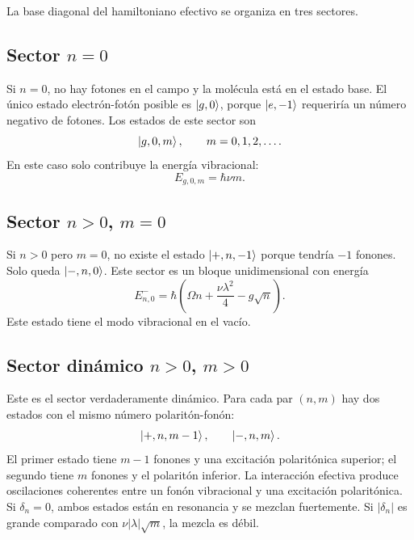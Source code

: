 \documentclass[11pt]{article}
\begin{document}
La base diagonal del hamiltoniano efectivo se organiza en tres sectores.

\subsection{Sector \texorpdfstring{$n=0$}{n=0}}

Si $n=0$, no hay fotones en el campo y la mol\'ecula est\'a en el estado base.
El \'unico estado electr\'on-fot\'on posible es $\ket{g,0}$, porque
$\ket{e,-1}$ requerir\'ia un n\'umero negativo de fotones. Los estados de este
sector son
\begin{equation}
  \ket{g,0,m},
  \qquad
  m=0,1,2,\ldots.
\end{equation}
En este caso solo contribuye la energ\'ia vibracional:
\begin{equation}
  \boxed{
  E_{g,0,m}=\hbar\nu m.
  }
\end{equation}

\subsection{Sector \texorpdfstring{$n>0$, $m=0$}{n mayor que cero, m=0}}

Si $n>0$ pero $m=0$, no existe el estado $\ket{+,n,-1}$ porque tendr\'ia
$-1$ fonones. Solo queda $\ket{-,n,0}$. Este sector es un bloque
unidimensional con energ\'ia
\begin{equation}
  \boxed{
  E_{n,0}^{-}
  =
  \hbar\left(\Omega n+\frac{\nu\lambda^2}{4}-g\sqrt n\right).
  }
\end{equation}
Este estado tiene el modo vibracional en el vac\'io.

\subsection{Sector din\'amico \texorpdfstring{$n>0$, $m>0$}{n mayor que cero, m mayor que cero}}

Este es el sector verdaderamente din\'amico. Para cada par $(n,m)$ hay dos
estados con el mismo n\'umero polarit\'on-fon\'on:
\begin{equation}
  \ket{+,n,m-1},
  \qquad
  \ket{-,n,m}.
\end{equation}
El primer estado tiene $m-1$ fonones y una excitaci\'on polarit\'onica
superior; el segundo tiene $m$ fonones y el polarit\'on inferior. La interacci\'on
efectiva produce oscilaciones coherentes entre un fon\'on vibracional y una
excitaci\'on polarit\'onica. Si $\delta_n=0$, ambos estados est\'an en
resonancia y se mezclan fuertemente. Si $|\delta_n|$ es grande comparado con
$\nu|\lambda|\sqrt m$, la mezcla es d\'ebil.
\end{document}
